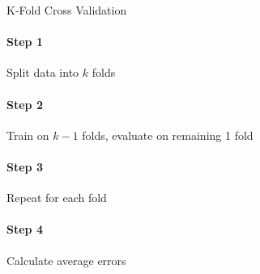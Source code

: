 \begin{KR}{K-Fold Cross Validation}\\
\paragraph{Step 1}
Split data into $k$ folds
\paragraph{Step 2}
Train on $k - 1$ folds, evaluate on remaining 1 fold
\paragraph{Step 3}
Repeat for each fold
\paragraph{Step 4}
Calculate average errors
\end{KR}



